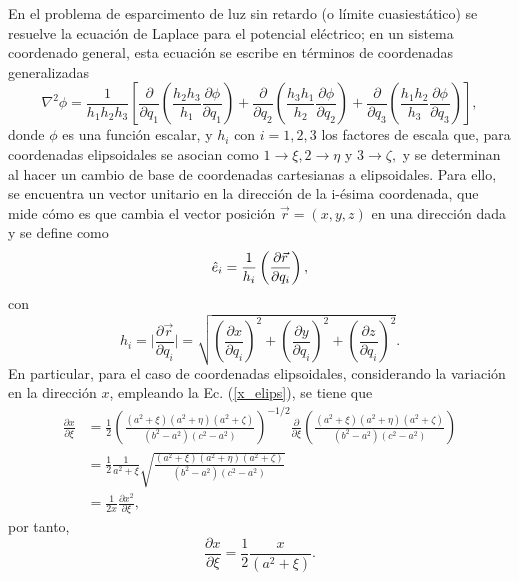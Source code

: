 En el problema de esparcimento de luz sin retardo (o límite cuasiestático) se resuelve la ecuación de Laplace para el potencial eléctrico; en un sistema coordenado general, esta ecuación se escribe en términos de coordenadas generalizadas \cite{Arfken}
\begin{equation}
	\nabla^2\phi=\frac{1}{h_1h_2h_3}\left[\frac{\partial}{\partial q_1}\left(\frac{h_2h_3}{h_1}\frac{\partial\phi}{\partial q_1}\right)+\frac{\partial}{\partial q_2}\left(\frac{h_3h_1}{h_2}\frac{\partial\phi}{\partial q_2}\right)+\frac{\partial}{\partial q_3}\left(\frac{h_1h_2}{h_3}\frac{\partial\phi}{\partial q_3}\right)\right],
	\label{laplaciano}    
\end{equation}
donde $\phi$ es una función escalar, y  $h_i$ con $i=1,2,3$ los factores de escala que, para coordenadas elipsoidales se asocian como $1\rightarrow\xi, 2\rightarrow\eta$ y $3\rightarrow\zeta,$ y se determinan al hacer un cambio de base de coordenadas cartesianas a elipsoidales. Para ello, se encuentra un vector unitario en la dirección de la i-ésima coordenada, que mide cómo es que cambia el vector posición $\vec{r}=(x,y,z)$ en una dirección dada y se define como \cite{Arfken}
\begin{equation}
	\hat{e}_{i}=\frac{1}{h_i}\left(\frac{\partial \Vec{r}}{\partial q_i}\right),     
\end{equation}
con
\begin{equation}
	h_i=\Big|\frac{\partial \Vec{r}}{\partial q_i}\Big|=\sqrt{\left(\frac{\partial x}{\partial q_i}\right)^2+\left(\frac{\partial y}{\partial q_i}\right)^2+\left(\frac{\partial z}{\partial q_i}\right)^2}.
\end{equation} 
En particular, para el caso de coordenadas elipsoidales, considerando la variación en la dirección $x$, empleando la Ec. (\ref{x_elips}), se tiene que \begin{align*}
	\frac{\partial x}{\partial \xi}&=\frac{1}{2}\left(\frac{(a^2+\xi)(a^2+\eta)(a^2+\zeta)}{(b^2-a^2)(c^2-a^2)}\right)^{-1/2}\frac{\partial}{\partial \xi}\left(\frac{(a^2+\xi)(a^2+\eta)(a^2+\zeta)}{(b^2-a^2)(c^2-a^2)}\right)\nonumber\\
	&=\frac{1}{2}\frac{1}{a^2+\xi}\sqrt{\frac{(a^2+\xi)(a^2+\eta)(a^2+\zeta)}{(b^2-a^2)(c^2-a^2)}}\nonumber\\
	&=\frac{1}{2x}\frac{\partial x^2}{\partial\xi},
\end{align*}
por tanto,
\begin{equation*}
	\frac{\partial x}{\partial \xi}=\frac{1}{2}\frac{x}{(a^2+\xi)}.
\end{equation*}
